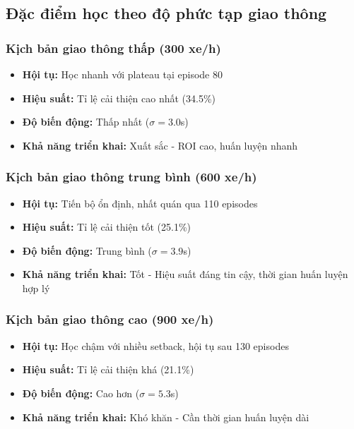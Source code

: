 \subsection{Đặc điểm học theo độ phức tạp giao thông}

\subsubsection{Kịch bản giao thông thấp (300 xe/h)}
\begin{itemize}
    \item \textbf{Hội tụ:} Học nhanh với plateau tại episode 80
    \item \textbf{Hiệu suất:} Tỉ lệ cải thiện cao nhất (34.5\%)
    \item \textbf{Độ biến động:} Thấp nhất ($\sigma = 3.0$s)
    \item \textbf{Khả năng triển khai:} Xuất sắc - ROI cao, huấn luyện nhanh
\end{itemize}

\subsubsection{Kịch bản giao thông trung bình (600 xe/h)}
\begin{itemize}
    \item \textbf{Hội tụ:} Tiến bộ ổn định, nhất quán qua 110 episodes
    \item \textbf{Hiệu suất:} Tỉ lệ cải thiện tốt (25.1\%)
    \item \textbf{Độ biến động:} Trung bình ($\sigma = 3.9$s)
    \item \textbf{Khả năng triển khai:} Tốt - Hiệu suất đáng tin cậy, thời gian huấn luyện hợp lý
\end{itemize}

\subsubsection{Kịch bản giao thông cao (900 xe/h)}
\begin{itemize}
    \item \textbf{Hội tụ:} Học chậm với nhiều setback, hội tụ sau 130 episodes
    \item \textbf{Hiệu suất:} Tỉ lệ cải thiện khá (21.1\%)
    \item \textbf{Độ biến động:} Cao hơn ($\sigma = 5.3$s)
    \item \textbf{Khả năng triển khai:} Khó khăn - Cần thời gian huấn luyện dài
\end{itemize}

